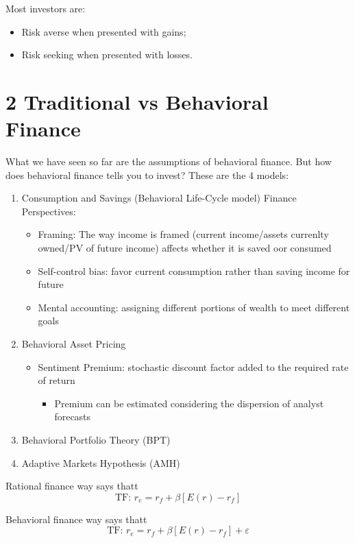 \documentclass[0pt, a4paper]{article}
\begin{document}
Most investors are:
\begin{itemize}
	\item Risk averse when presented with gains;
	\item Risk seeking when presented with losses.
\end{itemize}

\section*{2 Traditional vs Behavioral Finance}

What we have seen so far are the assumptions of behavioral finance. But how does behavioral finance tells you to invest? These are the 4 models:
\begin{enumerate}
	\item Consumption and Savings (Behavioral Life-Cycle model) Finance Perspectives:
	\begin{itemize}
		\item Framing: The way income is framed (current income/assets currenlty owned/PV of future income) affects whether it is saved oor consumed
		\item Self-control bias: favor current consumption rather than saving income for future
		\item Mental accounting: assigning different portions of wealth to meet different goals
	\end{itemize}
	\item Behavioral Asset Pricing
	\begin{itemize}
		\item Sentiment Premium: stochastic discount factor added to the required rate of return
		\begin{itemize}
			\item Premium can be estimated considering the dispersion of analyst forecasts
		\end{itemize}
	\end{itemize}
	\item Behavioral Portfolio Theory (BPT)
	\item Adaptive Markets Hypothesis (AMH)
\end{enumerate}

Rational finance way says thatt
$$\text{TF: }r_e=r_f+\beta \left[E(r)-r_f\right]$$

Behavioral finance way says thatt
$$\text{TF: }r_e=r_f+\beta \left[E(r)-r_f\right]+\varepsilon$$
\end{document}

